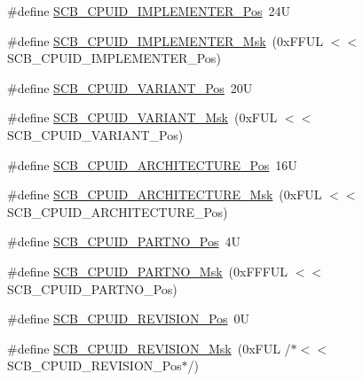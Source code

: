 \begin{DoxyCompactItemize}
\item 
\#define \mbox{\hyperlink{group___c_m_s_i_s___s_c_b_ga58686b88f94f789d4e6f429fe1ff58cf}{S\+C\+B\+\_\+\+C\+P\+U\+I\+D\+\_\+\+I\+M\+P\+L\+E\+M\+E\+N\+T\+E\+R\+\_\+\+Pos}}~24U
\item 
\#define \mbox{\hyperlink{group___c_m_s_i_s___s_c_b_ga0932b31faafd47656a03ced75a31d99b}{S\+C\+B\+\_\+\+C\+P\+U\+I\+D\+\_\+\+I\+M\+P\+L\+E\+M\+E\+N\+T\+E\+R\+\_\+\+Msk}}~(0x\+F\+F\+U\+L $<$$<$ S\+C\+B\+\_\+\+C\+P\+U\+I\+D\+\_\+\+I\+M\+P\+L\+E\+M\+E\+N\+T\+E\+R\+\_\+\+Pos)
\item 
\#define \mbox{\hyperlink{group___c_m_s_i_s___s_c_b_ga104462bd0815391b4044a70bd15d3a71}{S\+C\+B\+\_\+\+C\+P\+U\+I\+D\+\_\+\+V\+A\+R\+I\+A\+N\+T\+\_\+\+Pos}}~20U
\item 
\#define \mbox{\hyperlink{group___c_m_s_i_s___s_c_b_gad358dfbd04300afc1824329d128b99e8}{S\+C\+B\+\_\+\+C\+P\+U\+I\+D\+\_\+\+V\+A\+R\+I\+A\+N\+T\+\_\+\+Msk}}~(0x\+F\+U\+L $<$$<$ S\+C\+B\+\_\+\+C\+P\+U\+I\+D\+\_\+\+V\+A\+R\+I\+A\+N\+T\+\_\+\+Pos)
\item 
\#define \mbox{\hyperlink{group___c_m_s_i_s___s_c_b_gaf8b3236b08fb8e840efb682645fb0e98}{S\+C\+B\+\_\+\+C\+P\+U\+I\+D\+\_\+\+A\+R\+C\+H\+I\+T\+E\+C\+T\+U\+R\+E\+\_\+\+Pos}}~16U
\item 
\#define \mbox{\hyperlink{group___c_m_s_i_s___s_c_b_gafae4a1f27a927338ae9dc51a0e146213}{S\+C\+B\+\_\+\+C\+P\+U\+I\+D\+\_\+\+A\+R\+C\+H\+I\+T\+E\+C\+T\+U\+R\+E\+\_\+\+Msk}}~(0x\+F\+U\+L $<$$<$ S\+C\+B\+\_\+\+C\+P\+U\+I\+D\+\_\+\+A\+R\+C\+H\+I\+T\+E\+C\+T\+U\+R\+E\+\_\+\+Pos)
\item 
\#define \mbox{\hyperlink{group___c_m_s_i_s___s_c_b_ga705f68eaa9afb042ca2407dc4e4629ac}{S\+C\+B\+\_\+\+C\+P\+U\+I\+D\+\_\+\+P\+A\+R\+T\+N\+O\+\_\+\+Pos}}~4U
\item 
\#define \mbox{\hyperlink{group___c_m_s_i_s___s_c_b_ga98e581423ca016680c238c469aba546d}{S\+C\+B\+\_\+\+C\+P\+U\+I\+D\+\_\+\+P\+A\+R\+T\+N\+O\+\_\+\+Msk}}~(0x\+F\+F\+F\+U\+L $<$$<$ S\+C\+B\+\_\+\+C\+P\+U\+I\+D\+\_\+\+P\+A\+R\+T\+N\+O\+\_\+\+Pos)
\item 
\#define \mbox{\hyperlink{group___c_m_s_i_s___s_c_b_ga3c3d9071e574de11fb27ba57034838b1}{S\+C\+B\+\_\+\+C\+P\+U\+I\+D\+\_\+\+R\+E\+V\+I\+S\+I\+O\+N\+\_\+\+Pos}}~0U
\item 
\#define \mbox{\hyperlink{group___c_m_s_i_s___s_c_b_ga2ec0448b6483f77e7f5d08b4b81d85df}{S\+C\+B\+\_\+\+C\+P\+U\+I\+D\+\_\+\+R\+E\+V\+I\+S\+I\+O\+N\+\_\+\+Msk}}~(0x\+F\+U\+L /$\ast$$<$$<$ S\+C\+B\+\_\+\+C\+P\+U\+I\+D\+\_\+\+R\+E\+V\+I\+S\+I\+O\+N\+\_\+\+Pos$\ast$/)

\end{DoxyCompactItemize}
